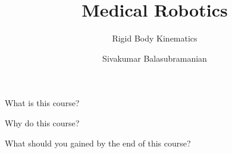 \documentclass[aspectratio=169]{beamer}
\title{Medical Robotics}
\subtitle{Rigid Body Kinematics}
\author{Sivakumar Balasubramanian}
\institute[Christian Medical College] %
{
  \inst{}%
  Department of Bioengineering\\
  Christian Medical College Vellore
}
\date{}
\begin{document}
\begin{frame}
  \titlepage
\end{frame}

\begin{frame}{What is this course?}
  
\end{frame}


\begin{frame}{Why do this course?}
  
\end{frame}


\begin{frame}{What should you gained by the end of this course?}
  
\end{frame}
\end{document}
